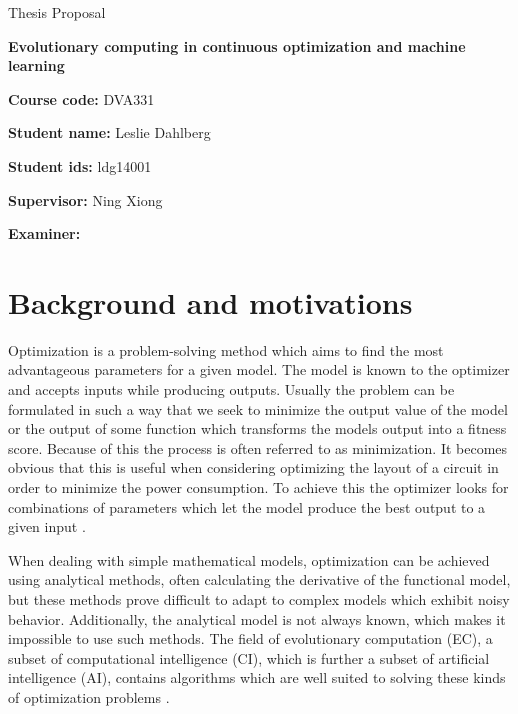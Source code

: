 \documentclass[12pt, titlepage, a4paper]{article}
\begin{document}
\begin{center}
  \LARGE
  Thesis Proposal

  \LARGE
  \textbf{Evolutionary computing in continuous optimization and machine learning}

\end{center}

\vspace{1cm}

\large
\noindent
\textbf{Course code:} DVA331

\large
\noindent
\textbf{Student name:} Leslie Dahlberg

\large
\noindent
\textbf{Student ids:} ldg14001

\large
\noindent
\textbf{Supervisor:} Ning Xiong

\large
\noindent
\textbf{Examiner:}

\normalsize


\section{Background and motivations}

Optimization is a problem-solving method which aims to find the most advantageous parameters for a given model. The model is known to the optimizer and accepts inputs while producing outputs. Usually the problem can be formulated in such a way that we seek to minimize the output value of the model or the output of some function which transforms the models output into a fitness score. Because of this the process is often referred to as minimization. It becomes obvious that this is useful when considering optimizing the layout of a circuit in order to minimize the power consumption. To achieve this the optimizer looks for combinations of parameters which let the model produce the best output to a given input \cite{Eiben2015_origins}.


When dealing with simple mathematical models, optimization can be achieved using analytical methods, often calculating the derivative of the functional model, but these methods prove difficult to adapt to complex models which exhibit noisy behavior. Additionally, the analytical model is not always known, which makes it impossible to use such methods. The field of evolutionary computation (EC), a subset of computational intelligence (CI), which is further a subset of artificial intelligence (AI), contains algorithms which are well suited to solving these kinds of optimization problems \cite{Michalewicz1997,zhang2015comprehensive}.
\end{document}
